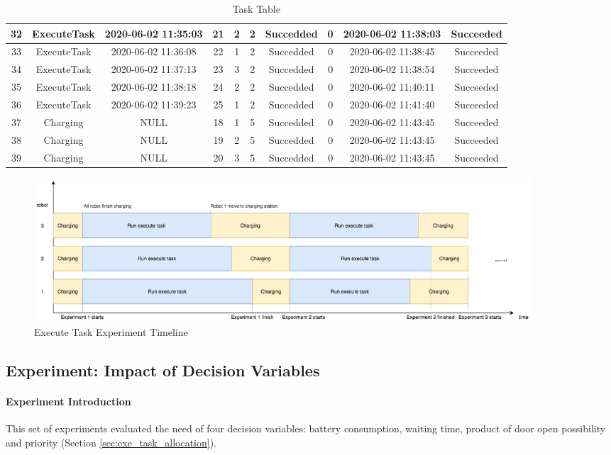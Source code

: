 \begin{table}[]
{\begin{tabular}{|c|c|c|c|c|c|c|c|c|c|}
32 & ExecuteTask & 2020-06-02 11:35:03 & 21 & 2 & 2 & Succedded & 0    & 2020-06-02 11:38:03 & Succeeded \\ \hline
33 & ExecuteTask & 2020-06-02 11:36:08 & 22 & 1 & 2 & Succedded & 0    & 2020-06-02 11:38:45 & Succeeded \\ \hline
34 & ExecuteTask & 2020-06-02 11:37:13 & 23 & 3 & 2 & Succedded & 0    & 2020-06-02 11:38:54 & Succeeded \\ \hline
35 & ExecuteTask & 2020-06-02 11:38:18 & 24 & 2 & 2 & Succedded & 0    & 2020-06-02 11:40:11 & Succeeded \\ \hline
36 & ExecuteTask & 2020-06-02 11:39:23 & 25 & 1 & 2 & Succedded & 0    & 2020-06-02 11:41:40 & Succeeded \\ \hline
37 & Charging    & NULL                & 18 & 1 & 5 & Succedded & 0 & 2020-06-02 11:43:45 & Succeeded \\ \hline
38 & Charging    & NULL                & 19 & 2 & 5 & Succedded & 0 & 2020-06-02 11:43:45 & Succeeded \\ \hline
39 & Charging    & NULL                & 20 & 3 & 5 & Succedded & 0 & 2020-06-02 11:43:45 & Succeeded \\ \hline
\end{tabular}}
\caption{Task Table}
\label{tab:exp_task_table}
\end{table}

\begin{figure}[htbp]
    \centering
    \includegraphics[width = 0.9\textwidth]{content/images/ch5/exe_exp_timeline.drawio.png}
    \caption{Execute Task Experiment Timeline}
    \label{fig:execute_task_experiment_timeline}
\end{figure}

\subsection{Experiment: Impact of Decision Variables}

\paragraph{Experiment Introduction} 
This set of experiments evaluated the need of four decision variables: battery consumption, waiting time, product of door open possibility and priority (Section \ref{sec:exe_task_allocation}). 

